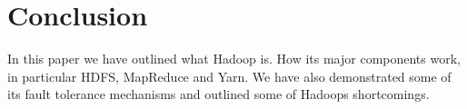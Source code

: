 \section{Conclusion}

In this paper we have outlined what Hadoop is. How its major components work, in particular HDFS, MapReduce and Yarn. We have also demonstrated some of its fault tolerance mechanisms and outlined some of Hadoops shortcomings.